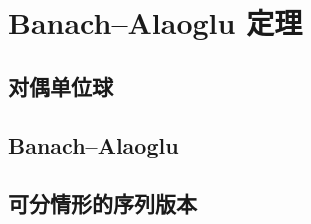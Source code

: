 \section{Banach–Alaoglu 定理}
\label{b1:sec:0903}


\subsection{对偶单位球}
\label{b1:subsec:090301}

\subsection{Banach–Alaoglu}
\label{b1:subsec:090302}

\subsection{可分情形的序列版本}
\label{b1:subsec:090303}


